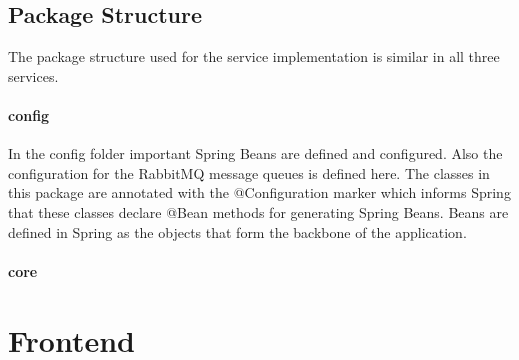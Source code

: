 \subsection{Package Structure}
\label{sec:folder_structure}
The package structure used for the service implementation is similar in all three services.

\paragraph{config}
In the config folder important Spring Beans are defined and configured.
Also the configuration for the RabbitMQ message queues is defined here.
The classes in this package are annotated with the @Configuration marker which informs Spring that these classes declare @Bean methods for generating Spring Beans.
Beans are defined in Spring as the objects that form the backbone of the application.

\paragraph{core}



\section{Frontend}
\label{sec:frontend}